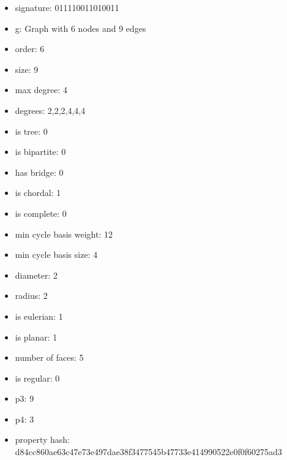 \begin{itemize}
\item signature: 011110011010011
\item g: Graph with 6 nodes and 9 edges
\item order: 6
\item size: 9
\item max degree: 4
\item degrees: 2,2,2,4,4,4
\item is tree: 0
\item is bipartite: 0
\item has bridge: 0
\item is chordal: 1
\item is complete: 0
\item min cycle basis weight: 12
\item min cycle basis size: 4
\item diameter: 2
\item radius: 2
\item is eulerian: 1
\item is planar: 1
\item number of faces: 5
\item is regular: 0
\item p3: 9
\item p4: 3
\item property hash: d84cc860ae63c47e73e497dae38f3477545b47733e414990522e0f0f60275ad3
\end{itemize}
\newpage
